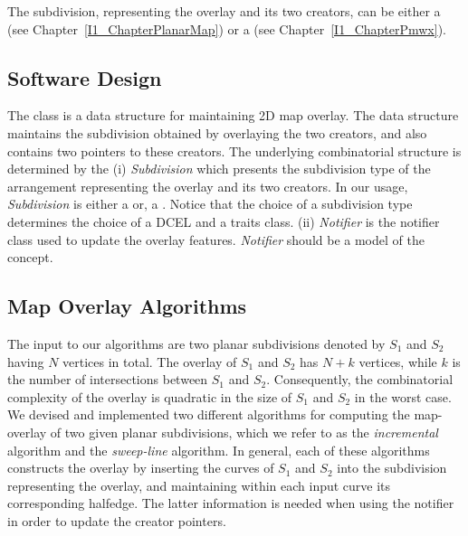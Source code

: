 \begin{ccTexOnly}

The subdivision, representing the overlay and its two creators, 
can be either a  
(see Chapter~\ref{I1_ChapterPlanarMap}) 
or a  
(see Chapter~\ref{I1_ChapterPmwx}).

\subsection*{Software Design}
The  class 
is a data structure for maintaining 2D map overlay.
The data structure maintains the subdivision obtained by overlaying 
the two creators,
and also contains two pointers to these creators. 
The underlying combinatorial structure is determined by the
(i) {\it Subdivision} which presents the subdivision type of the arrangement 
representing the overlay and its two creators. 
In our usage, {\it Subdivision} is either a  or, 
a .
Notice that the choice of a subdivision type determines the choice 
of a DCEL and a traits class.
(ii) {\it Notifier} is the notifier class used to update the overlay features. 
{\it Notifier} should be a model of the 
 concept.

\subsection*{Map Overlay Algorithms}
The input to our algorithms are two planar subdivisions denoted by $S_1$ and $S_2$ having 
$N$ vertices in total. The overlay of $S_1$ and $S_2$ has $N+k$ vertices, 
while $k$ is the number of intersections between $S_1$ and $S_2$. 
Consequently, the combinatorial complexity of the overlay is quadratic 
in the size of $S_1$ and $S_2$ in the worst case.
We devised and implemented two different algorithms for computing the map-overlay 
of two given planar subdivisions, 
which we refer to as the {\it incremental} algorithm and the {\it sweep-line} algorithm. 
In general, each of these algorithms constructs the overlay by inserting 
the curves of $S_1$ and $S_2$ into the subdivision representing the overlay,
and maintaining within each input curve its corresponding halfedge. 
The latter information is needed when using the notifier in order to
update the creator pointers. 


\end{ccTexOnly}
